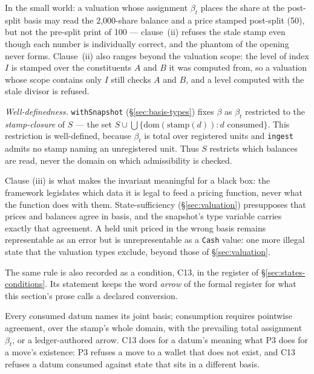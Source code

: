 \noindent
In the small world: a valuation whose assignment $\beta_t$ places the share at
the post-split basis may read the 2,000-share balance and a price stamped
post-split (50), but not the pre-split print of 100 --- clause~(ii) refuses the
stale stamp even though each number is individually correct, and the
 phantom of the opening never forms. Clause~(ii) also ranges
beyond the valuation scope: the level of index $I$ is stamped over the
constituents $A$ and $B$ it was computed from, so a valuation whose scope
contains only $I$ still checks $A$ and $B$, and a level computed with the stale
divisor is refused.

\emph{Well-definedness.} \texttt{withSnapshot} (\S\ref{sec:basis-types}) fixes $\beta$
as $\beta_t$ restricted to the \emph{stamp-closure} of $S$ --- the set
$S\cup\bigcup\{\mathrm{dom}(\mathrm{stamp}(d)) : d \text{ consumed}\}$. This restriction
is well-defined, because $\beta_t$ is total over registered units and \texttt{ingest}
admits no stamp naming an unregistered unit. Thus $S$ restricts which balances are read,
never the domain on which admissibility is checked.

Clause (iii) is what makes the invariant meaningful for a black box: the
framework legislates which data it is legal to feed a pricing function, never
what the function does with them. State-sufficiency (\S\ref{sec:valuation})
presupposes that prices and balances agree in basis, and the snapshot's type
variable carries exactly that agreement. A held unit priced in the wrong basis
remains representable as an error but is unrepresentable as a \texttt{Cash}
value: one more illegal state that the valuation types exclude, beyond those of
\S\ref{sec:valuation}.

The same rule is also recorded as a condition, C13, in the register of
\S\ref{sec:states-conditions}. Its statement keeps the word \emph{arrow} of the formal
register for what this section's prose calls a declared conversion.

\begin{description}[style=nextline]
\item[C13 (basis edge).]\hypertarget{cond:C13}{}\label{cond:C13} Every consumed datum
names its joint basis; consumption requires pointwise agreement, over the stamp's whole
domain, with the prevailing total assignment $\beta_t$, or a ledger-authored arrow. C13 does for a datum's meaning what P3 does for a move's existence: P3 refuses a
move to a wallet that does not exist, and C13 refuses a datum consumed against state
that sits in a different basis.
\end{description}

